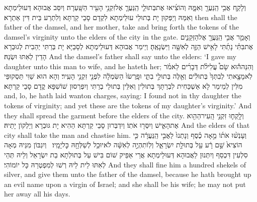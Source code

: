 {וְלָקַ֛ח אֲבִ֥י הַֽנַּעֲרָ֖ וְאִמָּ֑הּ וְהוֹצִ֜יאוּ אֶת\maqqaf בְּתוּלֵ֧י הַֽנַּעֲרָ֛ אֶל\maqqaf זִקְנֵ֥י הָעִ֖יר הַשָּֽׁעְרָה׃}
{וְיִסַּב אֲבוּהָא דְּעוּלֵימְתָא וְאִמַּהּ וְיַפְּקוּן יָת בְּתוּלֵי עוּלֵימְתָא לִקְדָם סָבֵי קַרְתָּא וְלִתְרַע בֵּית דִּין אַתְרָא׃}
{then shall the father of the damsel, and her mother, take and bring forth the tokens of the damsel’s virginity unto the elders of the city in the gate.}{}
{וְאָמַ֛ר אֲבִ֥י הַֽנַּעֲרָ֖ אֶל\maqqaf הַזְּקֵנִ֑ים אֶת\maqqaf בִּתִּ֗י נָתַ֜תִּי לָאִ֥ישׁ הַזֶּ֛ה לְאִשָּׁ֖ה וַיִּשְׂנָאֶֽהָ׃}
{וְיֵימַר אֲבוּהָא דְּעוּלֵימְתָא לְסָבַיָּא יָת בְּרַתִּי יְהַבִית לְגוּבְרָא הָדֵין לְאִתּוּ וּשְׂנַהּ׃}
{And the damsel’s father shall say unto the elders: ‘I gave my daughter unto this man to wife, and he hateth her;}{}
{וְהִנֵּה\maqqaf ה֡וּא שָׂם֩ עֲלִילֹ֨ת דְּבָרִ֜ים לֵאמֹ֗ר לֹֽא\maqqaf מָצָ֤אתִי לְבִתְּךָ֙ בְּתוּלִ֔ים וְאֵ֖לֶּה בְּתוּלֵ֣י בִתִּ֑י וּפָֽרְשׂוּ֙ הַשִּׂמְלָ֔ה לִפְנֵ֖י זִקְנֵ֥י הָעִֽיר׃}
{וְהָא הוּא שַׁוִּי תַּסְקוּפֵּי מִלִּין לְמֵימַר לָא אַשְׁכַּחִית לִבְרַתָּךְ בְּתוּלִין וְאִלֵּין בְּתוּלֵי בְרַתִּי וְיִפְרְסוּן שׁוֹשִׁפָּא קֳדָם סָבֵי קַרְתָּא׃}
{and, lo, he hath laid wanton charges, saying: I found not in thy daughter the tokens of virginity; and yet these are the tokens of my daughter’s virginity.’ And they shall spread the garment before the elders of the city.}{}
{וְלָ֥קְח֛וּ זִקְנֵ֥י הָֽעִיר\maqqaf הַהִ֖וא אֶת\maqqaf הָאִ֑ישׁ וְיִסְּר֖וּ אֹתֽוֹ׃}
{וְיִדְבְּרוּן סָבֵי קַרְתָּא הַהִיא יָת גּוּבְרָא וְיַלְקוֹן יָתֵיהּ׃}
{And the elders of that city shall take the man and chastise him.}{}
{וְעָנְשׁ֨וּ אֹת֜וֹ מֵ֣אָה כֶ֗סֶף וְנָתְנוּ֙ לַאֲבִ֣י הַֽנַּעֲרָ֔ה כִּ֤י הוֹצִיא֙ שֵׁ֣ם רָ֔ע עַ֖ל בְּתוּלַ֣ת יִשְׂרָאֵ֑ל וְלֽוֹ\maqqaf תִהְיֶ֣ה לְאִשָּׁ֔ה לֹא\maqqaf יוּכַ֥ל לְשַׁלְּחָ֖הּ כׇּל\maqqaf יָמָֽיו׃ \setuma }
{וְיִגְבּוֹן מִנֵּיהּ מְאָה סִלְעִין דִּכְסַף וְיִתְּנוּן לַאֲבוּהָא דְּעוּלֵימְתָא אֲרֵי אַפֵּיק שׁוֹם בִּישׁ עַל בְּתוּלְתָא בַת יִשְׂרָאֵל וְלֵיהּ תְּהֵי לְאִתּוּ לֵית לֵיהּ רְשׁוּ לְמִפְטְרַהּ כָּל יוֹמוֹהִי׃}
{And they shall fine him a hundred shekels of silver, and give them unto the father of the damsel, because he hath brought up an evil name upon a virgin of Israel; and she shall be his wife; he may not put her away all his days.}{}

